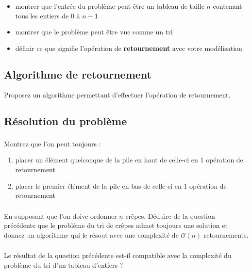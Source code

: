 \documentclass
[12pt]
{article}
\begin{document}
\begin{itemize}
    \item montrer que l'entrée du problème peut être un tableau de taille $n$ contenant tous les entiers de $0$ à $n-1$
    \item montrer que le problème peut être vue comme un tri
    \item définir ce que signifie l'opération de {\bf retournement} avec votre modélisation
\end{itemize}

\subsection{Algorithme de retournement}

Proposez un algorithme permettant d'effectuer l'opération de retournement.

\subsection{Résolution du problème}

\subsubsection{}
Montrez que l'on peut toujours :

\begin{enumerate}
    \item placer un élément quelconque de la pile en haut de celle-ci en 1 opération de retournement
    \item placer le premier élément de la pile en bas de celle-ci en 1 opération de retournement
\end{enumerate}

\subsubsection{}

En supposant que l'on doive ordonner $n$ crêpes. Déduire de la question précédente que le problème du tri de crêpes admet toujours une solution et donnez un algorithme qui le résout avec une complexité de $\mathcal{O}(n)$ retournements.

\subsubsection{}

Le résultat de la question précédente est-il compatible avec la complexité du problème du tri d'un tableau d'entiers ?
\end{document}
